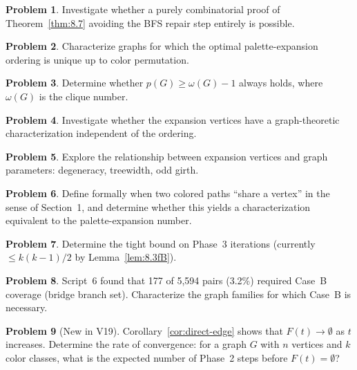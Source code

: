 \documentclass[12pt,a4paper]{article}
\theoremstyle{definition}
\newtheorem{problem}{Problem}[section]
\begin{document}
\begin{problem}
Investigate whether a purely combinatorial proof of Theorem~\ref{thm:8.7}
avoiding the BFS repair step entirely is possible.
\end{problem}

\begin{problem}
Characterize graphs for which the optimal palette-expansion ordering is
unique up to color permutation.
\end{problem}

\begin{problem}
Determine whether $p(G) \geq \omega(G)-1$ always holds, where $\omega(G)$
is the clique number.
\end{problem}

\begin{problem}
Investigate whether the expansion vertices have a graph-theoretic
characterization independent of the ordering.
\end{problem}

\begin{problem}
Explore the relationship between expansion vertices and graph parameters:
degeneracy, treewidth, odd girth.
\end{problem}

\begin{problem}
Define formally when two colored paths ``share a vertex'' in the sense of
Section~1, and determine whether this yields a characterization equivalent
to the palette-expansion number.
\end{problem}

\begin{problem}
Determine the tight bound on Phase~3 iterations (currently $\leq
k(k-1)/2$ by Lemma~\ref{lem:8.3fB}).
\end{problem}

\begin{problem}
Script~6 found that 177 of 5,594 pairs (3.2\%) required Case~B coverage
(bridge branch set). Characterize the graph families for which Case~B is
necessary.
\end{problem}

\begin{problem}[New in V19]
Corollary~\ref{cor:direct-edge} shows that $F(t) \to \emptyset$ as $t$
increases. Determine the rate of convergence: for a graph $G$ with $n$
vertices and $k$ color classes, what is the expected number of Phase~2
steps before $F(t) = \emptyset$?
\end{problem}
\end{document}

